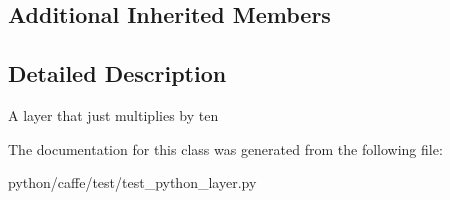 \subsection*{Additional Inherited Members}


\subsection{Detailed Description}
\begin{DoxyVerb}A layer that just multiplies by ten\end{DoxyVerb}
 

The documentation for this class was generated from the following file\+:\begin{DoxyCompactItemize}
\item 
python/caffe/test/test\+\_\+python\+\_\+layer.\+py\end{DoxyCompactItemize}
